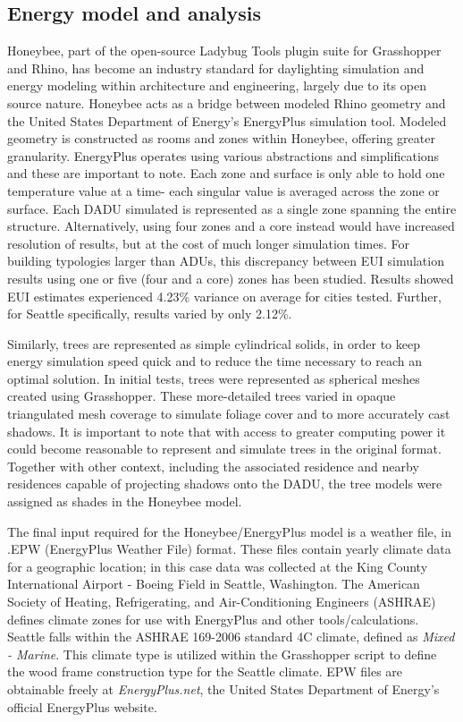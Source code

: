 \documentclass[sagev,times,Royal]{sagej}
\begin{document}
\subsection{Energy model and analysis}
Honeybee, part of the open-source Ladybug Tools plugin suite for Grasshopper and Rhino, has become an industry standard for daylighting simulation and energy modeling within architecture and engineering, largely due to its open source nature\cite{mackey2018tool}. Honeybee acts as a bridge between modeled Rhino geometry and the United States Department of Energy's EnergyPlus simulation tool. Modeled geometry is constructed as rooms and zones within Honeybee, offering greater granularity. EnergyPlus operates using various abstractions and simplifications and these are important to note\cite{EnergyPlusTMVersionDocumentation2021}. Each zone and surface is only able to hold one temperature value at a time- each singular value is averaged across the zone or surface. Each DADU simulated is represented as a single zone spanning the entire structure. Alternatively, using four zones and a core instead would have increased resolution of results, but at the cost of much longer simulation times. For building typologies larger than ADUs, this discrepancy between EUI simulation results using one or five (four and a core) zones has been studied\cite{SingleZoneVs2018}. Results showed EUI estimates experienced 4.23\% variance on average for cities tested. Further, for Seattle specifically, results varied by only 2.12\%.
 
Similarly, trees are represented as simple cylindrical solids, in order to keep energy simulation speed quick and to reduce the time necessary to reach an optimal solution. In initial tests, trees were represented as spherical meshes created using Grasshopper. These more-detailed trees varied in opaque triangulated mesh coverage to simulate foliage cover and to more accurately cast shadows. It is important to note that with access to greater computing power it could become reasonable to represent and simulate trees in the original format. Together with other context, including the associated residence and nearby residences capable of projecting shadows onto the DADU, the tree models were assigned as shades in the Honeybee model. 

The final input required for the Honeybee/EnergyPlus model is a weather file, in .EPW (EnergyPlus Weather File) format. These files contain yearly climate data for a geographic location; in this case data was collected at the King County International Airport - Boeing Field in Seattle, Washington. The American Society of Heating, Refrigerating, and Air-Conditioning Engineers (ASHRAE) defines climate zones for use with EnergyPlus and other tools/calculations. Seattle falls within the ASHRAE 169-2006 standard 4C climate, defined as \textit{Mixed - Marine}. This climate type is utilized within the Grasshopper script to define the wood frame construction type for the Seattle climate. EPW files are obtainable freely at \textit{EnergyPlus.net}, the United States Department of Energy's official EnergyPlus website.
\end{document}
